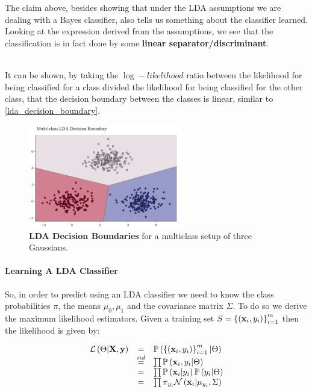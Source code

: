 The claim above, besides showing that under the LDA assumptions we are dealing with a Bayes classifier, also tells us something about the classifier learned. Looking at the expression derived from the assumptions, we see that the classification is in fact done by some \textbf{linear separator/discriminant}. 

~\\It can be shown, by taking the $\log-likelihood$ ratio between the likelihood for being classified for a class divided the likelihood for being classified for the other class, that the decision boundary between the classes is linear, similar to \autoref{lda_decision_boundary}.

\begin{figure}[h!]
	\centering
	\includegraphics[width=0.6\textwidth]{chapters/classification/figures/lda_decision_boundary.png}
	\caption{\textbf{LDA Decision Boundaries} for a multiclass setup of three Gaussians. \GitChapterThreeExamples}
	\label{lda_decision_boundary}
\end{figure}

\paragraph{Learning A LDA Classifier}
So, in order to predict using an LDA classifier we need to know the class probabilities $\pi$, the means $\mu_0, \mu_1$ and the covariance matrix $\Sigma$. To do so we derive the maximum likelihood estimators. Given a training set $S=\left\{\left(\mathbf{x}_i,y_i\right)\right\}^m_{i=1}$ then the likelihood is given by:

$$
\begin{array}{ccl}
\mathcal{L}\left(\Theta|\mathbf{X},\mathbf{y}\right) & = & \mathbb{P}\left(\left\{\left(\mathbf{x}_i,y_i\right)\right\}^m_{i=1}|\Theta\right)\\
& \overset{iid}{=} & \prod\mathbb{P}\left(\mathbf{x}_i,y_i|\Theta\right)  \\
& = & \prod\mathbb{P}\left(\mathbf{x}_i|y_i\right)\mathbb{P}\left(y_i|\Theta\right)\\
& = & \prod\pi_{y_i}\mathcal{N}\left(\mathbf{x}_i|\mu_{y_i},\Sigma\right)
\end{array}
$$

